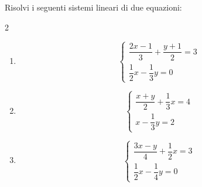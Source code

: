 
\begin{question}[ID=2.3, subtitle={Sistemi con frazioni in entrambe le equazioni}, difficulty=media, tags={sistemi, equazioni lineari, frazioni}]
Risolvi i seguenti sistemi lineari di due equazioni:
\begin{multicols}{2}
\begin{enumerate}[leftmargin=3.2cm]
    \item
    \[
    \begin{cases}
    \dfrac{2x-1}{3}+\dfrac{y+1}{2}=3\\
    \dfrac{1}{2}x-\dfrac{1}{3}y=0
    \end{cases}
    \]

    \item
    \[
    \begin{cases}
    \dfrac{x+y}{2}+\dfrac{1}{3}x=4\\
    x-\dfrac{1}{3}y=2
    \end{cases}
    \]

    \item
    \[
    \begin{cases}
    \dfrac{3x-y}{4}+\dfrac{1}{2}x=3\\
    \dfrac{1}{2}x-\dfrac{1}{4}y=0
    \end{cases}
    \]


\end{enumerate}
\end{multicols}
\end{question}
